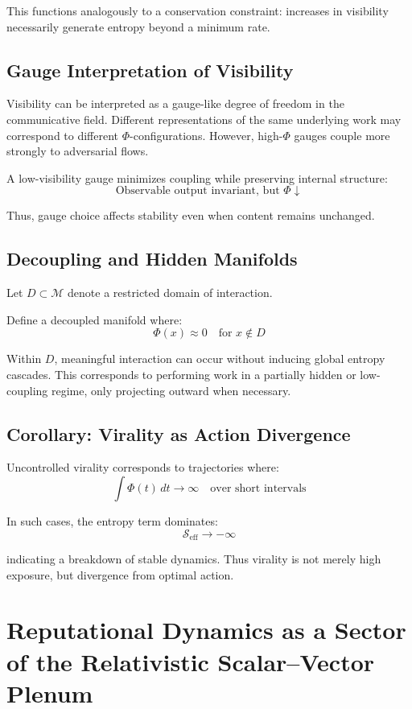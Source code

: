 \documentclass[12pt,a4paper]{article}
\begin{document}
This functions analogously to a conservation constraint: increases in visibility necessarily generate entropy beyond a minimum rate.

\subsection{Gauge Interpretation of Visibility}

Visibility can be interpreted as a gauge-like degree of freedom in the communicative field. Different representations of the same underlying work may correspond to different $\Phi$-configurations. However, high-$\Phi$ gauges couple more strongly to adversarial flows.

A low-visibility gauge minimizes coupling while preserving internal structure:
\[
\text{Observable output invariant, but } \Phi \downarrow
\]

Thus, gauge choice affects stability even when content remains unchanged.

\subsection{Decoupling and Hidden Manifolds}

Let $D \subset \mathcal{M}$ denote a restricted domain of interaction.

Define a decoupled manifold where:
\[
\Phi(x) \approx 0 \quad \text{for } x \notin D
\]

Within $D$, meaningful interaction can occur without inducing global entropy cascades. This corresponds to performing work in a partially hidden or low-coupling regime, only projecting outward when necessary.

\subsection{Corollary: Virality as Action Divergence}

Uncontrolled virality corresponds to trajectories where:
\[
\int \Phi(t)\,dt \to \infty \quad \text{over short intervals}
\]

In such cases, the entropy term dominates:
\[
\mathcal{S}_{\text{eff}} \to -\infty
\]

indicating a breakdown of stable dynamics. Thus virality is not merely high exposure, but divergence from optimal action.

\section{Reputational Dynamics as a Sector of the Relativistic Scalar--Vector Plenum}
\end{document}
